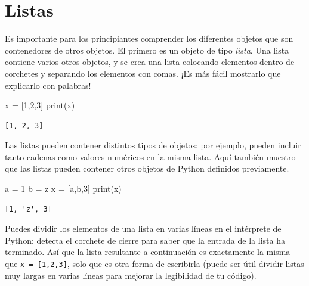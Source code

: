 \documentclass[
  letterpaper,
]{scrbook}
\newenvironment{Shaded}{\begin{snugshade}}{\end{snugshade}}
\newcommand{\BuiltInTok}[1]{\textcolor[rgb]{0.00,0.23,0.31}{#1}}
\newcommand{\DecValTok}[1]{\textcolor[rgb]{0.68,0.00,0.00}{#1}}
\newcommand{\NormalTok}[1]{\textcolor[rgb]{0.00,0.23,0.31}{#1}}
\newcommand{\OperatorTok}[1]{\textcolor[rgb]{0.37,0.37,0.37}{#1}}
\newcommand{\StringTok}[1]{\textcolor[rgb]{0.13,0.47,0.30}{#1}}
\begin{document}
\section{Listas}\label{listas}

Es importante para los principiantes comprender los diferentes objetos
que son contenedores de otros objetos. El primero es un objeto de tipo
\emph{lista}. Una lista contiene varios otros objetos, y se crea una
lista colocando elementos dentro de corchetes y separando los elementos
con comas. ¡Es más fácil mostrarlo que explicarlo con palabras!

\begin{Shaded}
\begin{Highlighting}[]
\NormalTok{x }\OperatorTok{=}\NormalTok{ [}\DecValTok{1}\NormalTok{,}\DecValTok{2}\NormalTok{,}\DecValTok{3}\NormalTok{]}
\BuiltInTok{print}\NormalTok{(x)}
\end{Highlighting}
\end{Shaded}

\begin{verbatim}
[1, 2, 3]
\end{verbatim}

Las listas pueden contener distintos tipos de objetos; por ejemplo,
pueden incluir tanto cadenas como valores numéricos en la misma lista.
Aquí también muestro que las listas pueden contener otros objetos de
Python definidos previamente.

\begin{Shaded}
\begin{Highlighting}[]
\NormalTok{a }\OperatorTok{=} \DecValTok{1}
\NormalTok{b }\OperatorTok{=} \StringTok{\textquotesingle{}z\textquotesingle{}}
\NormalTok{x }\OperatorTok{=}\NormalTok{ [a,b,}\DecValTok{3}\NormalTok{]}
\BuiltInTok{print}\NormalTok{(x)}
\end{Highlighting}
\end{Shaded}

\begin{verbatim}
[1, 'z', 3]
\end{verbatim}

Puedes dividir los elementos de una lista en varias líneas en el
intérprete de Python; detecta el corchete de cierre para saber que la
entrada de la lista ha terminado. Así que la lista resultante a
continuación es exactamente la misma que \texttt{x\ =\ {[}1,2,3{]}},
solo que es otra forma de escribirla (puede ser útil dividir listas muy
largas en varias líneas para mejorar la legibilidad de tu código).
\end{document}
